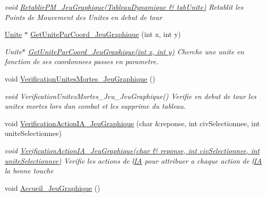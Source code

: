 \begin{DoxyCompactItemize}
\begin{DoxyCompactList}\small\item\em void \hyperlink{classJeu__graphique_a780cecdb8248b4e5612895b026a61a5a}{Retablir\+P\+M\+\_\+\+Jeu\+Graphique(\+Tableau\+Dynamique \& tab\+Unite)} Retablit les Points de Mouvement des Unites en debut de tour \end{DoxyCompactList}\item 
\hyperlink{classUnite}{Unite} $\ast$ \hyperlink{classJeu__graphique_ae511b5ba17776963d2e40008e46c1ebc}{Get\+Unite\+Par\+Coord\+\_\+\+Jeu\+Graphique} (int x, int y)
\begin{DoxyCompactList}\small\item\em Unite$\ast$ \hyperlink{classJeu__graphique_ae511b5ba17776963d2e40008e46c1ebc}{Get\+Unite\+Par\+Coord\+\_\+\+Jeu\+Graphique(int x, int y)} Cherche une unite en fonction de ses coordonnees passes en parametre. \end{DoxyCompactList}\item 
\mbox{\label{classJeu__graphique_a9ac2d26d1b68a94c04a8231e893ed47f}} 
void \hyperlink{classJeu__graphique_a9ac2d26d1b68a94c04a8231e893ed47f}{Verification\+Unites\+Mortes\+\_\+\+Jeu\+Graphique} ()
\begin{DoxyCompactList}\small\item\em void Verification\+Unites\+Mortes\+\_\+\+Jeu\+\_\+\+Jeu\+Graphique() Verifie en debut de tour les unites mortes lors d\textquotesingle{}un combat et les supprime du tableau. \end{DoxyCompactList}\item 
void \hyperlink{classJeu__graphique_ac5ea38ecd12b46fee29ba7967a1b1a55}{Verification\+Action\+I\+A\+\_\+\+Jeu\+Graphique} (char \&reponse, int civ\+Selectionnee, int unite\+Selectionnee)
\begin{DoxyCompactList}\small\item\em void \hyperlink{classJeu__graphique_ac5ea38ecd12b46fee29ba7967a1b1a55}{Verification\+Action\+I\+A\+\_\+\+Jeu\+Graphique(char \& reponse, int civ\+Selectionnee, int unite\+Selectionnee)} Verifie les actions de l\textquotesingle{}\hyperlink{classIA}{IA} pour attribuer a chaque action de l\textquotesingle{}\hyperlink{classIA}{IA} la bonne touche \end{DoxyCompactList}\item 
\mbox{\label{classJeu__graphique_a42894aac7cd7b37efe13ded6f47586de}} 
void \hyperlink{classJeu__graphique_a42894aac7cd7b37efe13ded6f47586de}{Accueil\+\_\+\+Jeu\+Graphique} ()

\end{DoxyCompactItemize}
